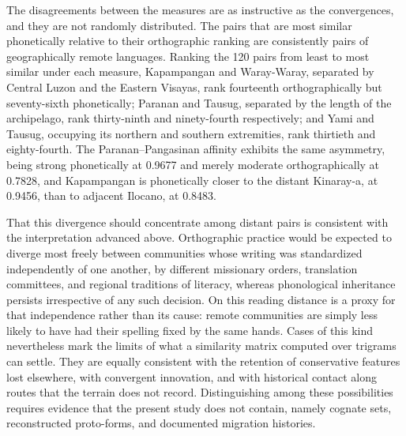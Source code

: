 The disagreements between the measures are as instructive as the convergences,
and they are not randomly distributed. The pairs that are most similar
phonetically relative to their orthographic ranking are consistently pairs of
geographically remote languages. Ranking the 120 pairs from least to most
similar under each measure, Kapampangan and Waray-Waray, separated by Central
Luzon and the Eastern Visayas, rank fourteenth orthographically but
seventy-sixth phonetically; Paranan and Tausug, separated by the length of the
archipelago, rank thirty-ninth and ninety-fourth respectively; and Yami and
Tausug, occupying its northern and southern extremities, rank thirtieth and
eighty-fourth. The Paranan--Pangasinan affinity exhibits the same asymmetry,
being strong phonetically at 0.9677 and merely moderate orthographically at
0.7828, and Kapampangan is phonetically closer to the distant Kinaray-a, at
0.9456, than to adjacent Ilocano, at 0.8483.

That this divergence should concentrate among distant pairs is consistent with
the interpretation advanced above. Orthographic practice would be expected to
diverge most freely between communities whose writing was standardized
independently of one another, by different missionary orders, translation
committees, and regional traditions of literacy, whereas phonological
inheritance persists irrespective of any such decision. On this reading
distance is a proxy for that independence rather than its cause: remote
communities are simply less likely to have had their spelling fixed by the same
hands. Cases of this kind nevertheless mark the limits of what a similarity
matrix computed over trigrams can settle. They are equally consistent with the
retention of conservative features lost elsewhere, with convergent innovation,
and with historical contact along routes that the terrain does not record.
Distinguishing among these possibilities requires evidence that the present
study does not contain, namely cognate sets, reconstructed proto-forms, and
documented migration histories.